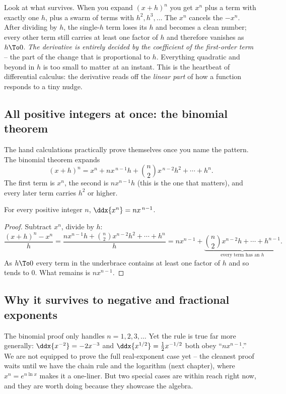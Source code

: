 \begin{happeningbox}
Look at what survives. When you expand $(x+h)^n$ you get $x^n$ plus a term with exactly
one $h$, plus a swarm of terms with $h^2, h^3,\dots$ The $x^n$ cancels the $-x^n$. After
dividing by $h$, the single-$h$ term loses its $h$ and becomes a clean number; every
other term still carries at least one factor of $h$ and therefore vanishes as $h\To 0$.
\emph{The derivative is entirely decided by the coefficient of the first-order term} --
the part of the change that is proportional to $h$. Everything quadratic and beyond in
$h$ is too small to matter at an instant. This is the heartbeat of differential calculus:
the derivative reads off the \emph{linear part} of how a function responds to a tiny nudge.
\end{happeningbox}

\subsection{All positive integers at once: the binomial theorem}

The hand calculations practically prove themselves once you name the pattern. The
binomial theorem expands
\[
  (x+h)^n
  = x^n + n x^{\,n-1} h + \binom{n}{2} x^{\,n-2} h^2 + \cdots + h^n .
\]
The first term is $x^n$, the second is $n x^{n-1}h$ (this is the one that matters), and
every later term carries $h^2$ or higher.

\begin{theorem}\label{ch11:thm-power-int}
For every positive integer $n$, $\ddx{x^n} = n x^{\,n-1}$.
\end{theorem}

\begin{proof}
Subtract $x^n$, divide by $h$:
\[
  \frac{(x+h)^n - x^n}{h}
  = \frac{n x^{n-1}h + \binom{n}{2}x^{n-2}h^2 + \cdots + h^n}{h}
  = n x^{n-1} + \underbrace{\binom{n}{2}x^{n-2}h + \cdots + h^{n-1}}_{\text{every term has an } h}.
\]
As $h\To 0$ every term in the underbrace contains at least one factor of $h$ and so tends
to $0$. What remains is $n x^{n-1}$.
\end{proof}

\subsection{Why it survives to negative and fractional exponents}

The binomial proof only handles $n=1,2,3,\dots$ Yet the rule is true far more generally:
$\ddx{x^{-2}} = -2x^{-3}$ and $\ddx{x^{1/2}} = \tfrac12 x^{-1/2}$ both obey
``$n x^{n-1}$.'' We are not equipped to prove the full real-exponent case yet -- the
cleanest proof waits until we have the chain rule and the logarithm (next chapter), where
$x^n = e^{n\ln x}$ makes it a one-liner. But two special cases are within reach right now,
and they are worth doing because they showcase the algebra.

